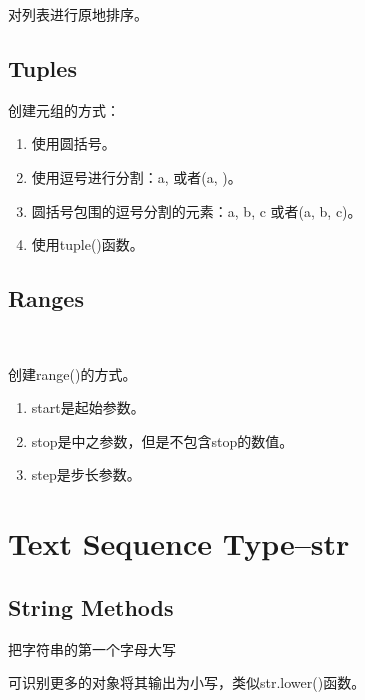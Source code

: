 \noindent{\color{red}{[].sort(*, key=None, reverse=False):}}
\par{对列表进行原地排序。}\\

\subsection{Tuples}
\noindent{\color{red}{tuple([iterable]):}}
\par{创建元组的方式：}
  \begin{enumerate}
  \item 使用圆括号。
  \item 使用逗号进行分割：a, 或者(a, )。
  \item 圆括号包围的逗号分割的元素：a, b, c 或者(a, b, c)。
  \item 使用tuple()函数。
  \end{enumerate}

\subsection{Ranges}
\noindent{\color{red}{range(stop):}}\\
\noindent{\color{red}{range(start, stop[, step]):}}
\par{创建range()的方式。}
  \begin{enumerate}
  \item start是起始参数。
  \item stop是中之参数，但是不包含stop的数值。
  \item step是步长参数。
  \end{enumerate}








\section{Text Sequence Type--str}
\subsection{String Methods}
\noindent{\color{red}{str.capitalize():}}
\par{把字符串的第一个字母大写}\\

\noindent{\color{red}{str.casefold():}}
\par{可识别更多的对象将其输出为小写，类似str.lower()函数。}\\

